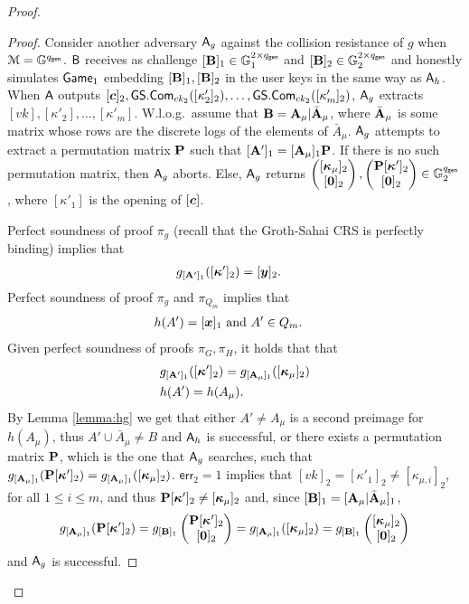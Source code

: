 \begin{proof}
\begin{proof}
Consider another adversary $\mathsf{A}_g$ against the collision resistance of $g$ when $\mathcal{M}=\mathbb{G}^{q_\mathsf{gen}}$. $\mathsf{B}$ receives as challenge $[\mathbf{{B}}]_1\in\mathbb{G}^{2\times {q_\mathsf{gen}}}_1$ and $[\mathbf{{B}}]_2\in\mathbb{G}^{2\times {q_\mathsf{gen}}}_2$ and honestly simulates $\mathsf{Game}_1$ embedding $[\mathbf{{B}}]_1,[\mathbf{{B}}]_2$ in the user keys in the same way as $\mathsf{A}_h$. When $\mathsf{A}$ outputs $[{\boldsymbol{c}}]_2,\allowbreak{\mathsf{GS}}.\mathsf{Com}_{ck_2}([\kappa'_2]_2),\ldots,\allowbreak{\mathsf{GS}}.\mathsf{Com}_{ck_2}([\kappa'_m]_2)$, $\mathsf{A}_g$ extracts $[vk],[\kappa'_2],\ldots,[\kappa'_m]$. W.l.o.g.~\allowbreak assume that $\mathbf{{B}}=\mathbf{{A}}_\mu|\bar{\mathbf{{A}}}_\mu$, where $\bar{\mathbf{{A}}}_\mu$ is some matrix whose rows are the discrete logs of the elements of $\bar{A}_\mu$. $\mathsf{A}_g$ attempts to extract a permutation matrix $\mathbf{{P}}$ such that  $[\mathbf{{A}}']_1=[\mathbf{{A}}_\mu]_1\mathbf{{P}}$. If there is no such permutation matrix, then $\mathsf{A}_g$ aborts. Else,  $\mathsf{A}_g$ returns
$\left(\begin{matrix}
	{[{\boldsymbol{\kappa}}_\mu]_2}\\
	{[{\boldsymbol{0}}]_2}\end{matrix}\right),
\left(\begin{matrix}
	{\mathbf{{P}}[{\boldsymbol{\kappa}}']_2}\\
	{[{\boldsymbol{0}}]_2}\end{matrix}\right)
\in\mathbb{G}^{q_\mathsf{gen}}_2$,
where $[\kappa'_1]$ is the opening of $[{\boldsymbol{c}}]$.

Perfect soundness of proof $\pi_g$  (recall that the Groth-Sahai CRS is perfectly binding)  implies that
\begin{align*}
&g_{[\matr{A}']_1}([\vecb{\kappa}']_2)=[\vecb{y}]_2. %
\end{align*}
Perfect soundness of proof $\pi_g$ and $\pi_{Q_m}$ implies that
\begin{align*}
&h(A')=[\vecb{x}]_1\text{ and } A'\in Q_m.%
\end{align*}
Given perfect soundness of proofs $\pi_G,\pi_H$, it holds that that
\begin{align*}
&g_{[\matr{A}']_1}([\vecb{\kappa}']_2)=g_{[\matr{A}_\mu]_1}([\vecb{\kappa}_\mu]_2)%
\\
&h(A')=h(A_\mu). %
\end{align*}
By Lemma \ref{lemma:hg} we get that either $A'\neq {A}_\mu$ is a second preimage for $h(A_\mu)$, thus $A'\cup\bar{A}_\mu\neq B$ and $\mathsf{A}_h$ is successful, or there exists a permutation matrix $\mathbf{{P}}$, which is the one that $\mathsf{A}_g$ searches, such that $g_{[\mathbf{{A}}_\mu]_1}(\mathbf{{P}}[{\boldsymbol{\kappa}}']_2)=g_{[\mathbf{{A}}_\mu]_1}([{\boldsymbol{\kappa}}_\mu]_2)$. $\mathsf{err}_2=1$ implies that $[vk]_2=[\kappa'_1]_2\neq[\kappa_{\mu,i}]_2$, for all $1\leq i\leq m$, and thus $\mathbf{{P}}[{\boldsymbol{\kappa}}']_2\neq [{\boldsymbol{\kappa}}_\mu]_2$ and, since $[\mathbf{{B}}]_1=[\mathbf{{A}}_\mu|\bar{\mathbf{{A}}}_\mu]_1$,
$$
g_{[\mathbf{{A}}_\mu]_1}(\mathbf{{P}}[{\boldsymbol{\kappa}}']_2)=
g_{[\mathbf{{B}}]_1}\left(\begin{matrix}
	{\mathbf{{P}}[{\boldsymbol{\kappa}}']_2}\\
	{[{\boldsymbol{0}}]_2}\end{matrix}\right)
=
g_{[\mathbf{{A}}_\mu]_1}([{\boldsymbol{\kappa}}_\mu]_2)
=
g_{[\mathbf{{B}}]_1}\left(\begin{matrix}
	{[{\boldsymbol{\kappa}}_\mu]_2}\\
	{[{\boldsymbol{0}}]_2}\end{matrix}\right)
$$ 
and $\mathsf{A}_g$ is successful.


\end{proof}
\end{proof}
